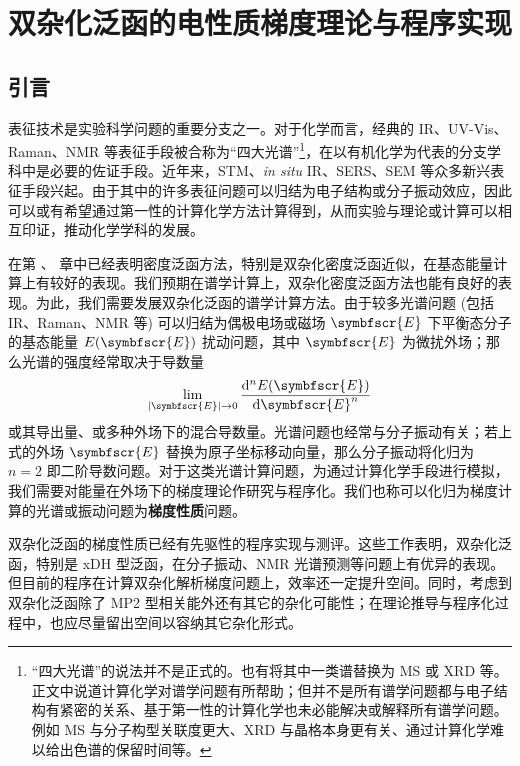 
\chapter{双杂化泛函的电性质梯度理论与程序实现}
\label{sec.3.title}

\section{引言}

表征技术是实验科学问题的重要分支之一。对于化学而言，经典的 IR、UV-Vis、Raman、NMR 等表征手段被合称为“四大光谱”\footnote{“四大光谱”的说法并不是正式的。也有将其中一类谱替换为 MS 或 XRD 等。正文中说道计算化学对谱学问题有所帮助；但并不是所有谱学问题都与电子结构有紧密的关系、基于第一性的计算化学也未必能解决或解释所有谱学问题。例如 MS 与分子构型关联度更大、XRD 与晶格本身更有关、通过计算化学难以给出色谱的保留时间等。}，在以有机化学为代表的分支学科中是必要的佐证手段。近年来，STM、\emph{in situ} IR、SERS、SEM 等众多新兴表征手段兴起。由于其中的许多表征问题可以归结为电子结构或分子振动效应，因此可以或有希望通过第一性的计算化学方法计算得到，从而实验与理论或计算可以相互印证，推动化学学科的发展。

在第 、 章中已经表明密度泛函方法，特别是双杂化密度泛函近似，在基态能量计算上有较好的表现。我们预期在谱学计算上，双杂化密度泛函方法也能有良好的表现。为此，我们需要发展双杂化泛函的谱学计算方法。由于较多光谱问题 (包括 IR、Raman、NMR 等) 可以归结为偶极电场或磁场 $\symbfscr{E}$ 下平衡态分子的基态能量 $E(\symbfscr{E})$ 扰动问题，其中 $\symbfscr{E}$ 为微扰外场；那么光谱的强度经常取决于导数量
\begin{equation}
    \lim_{|\symbfscr{E}| \rightarrow 0} \frac{\mathrm{d}^n E(\symbfscr{E})}{\mathrm{d} \symbfscr{E}^n}
\end{equation}
或其导出量、或多种外场下的混合导数量。光谱问题也经常与分子振动有关；若上式的外场 $\symbfscr{E}$ 替换为原子坐标移动向量，那么分子振动将化归为 $n = 2$ 即二阶导数问题。对于这类光谱计算问题，为通过计算化学手段进行模拟，我们需要对能量在外场下的梯度理论作研究与程序化。我们也称可以化归为梯度计算的光谱或振动问题为\textbf{梯度性质}问题。

双杂化泛函的梯度性质已经有先驱性的程序实现与测评\cite{Neese-Grimme.JCP.2007, Biczysko-Barone.JCTC.2010, Su-Xu.JCC.2013, Stoychev-Neese.JCTC.2018, Gu-Xu.JCTC.2021, Yan-Xu.JCTC.2022}。这些工作表明，双杂化泛函，特别是 xDH 型泛函，在分子振动、NMR 光谱预测等问题上有优异的表现。但目前的程序在计算双杂化解析梯度问题上，效率还一定提升空间。同时，考虑到双杂化泛函除了 MP2 型相关能外还有其它的杂化可能性；在理论推导与程序化过程中，也应尽量留出空间以容纳其它杂化形式。

